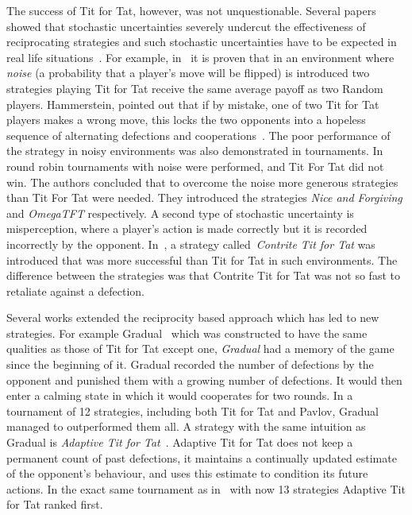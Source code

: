 The success of Tit for Tat, however, was not unquestionable. Several papers
showed that stochastic uncertainties severely undercut the effectiveness of
reciprocating strategies and such stochastic uncertainties have to be expected
in real life situations~\cite{Milinski1987}. For example, in~\cite{Molander1985}
it is
proven that in an environment where \textit{noise} (a probability that a
player's move will be flipped) is introduced two strategies playing Tit for Tat
receive the same average payoff as two Random players.
Hammerstein, pointed out that if by mistake, one of two
Tit for Tat players makes a wrong move, this locks the two opponents into a
hopeless sequence of alternating defections and cooperations~\cite{Hammerstein1984}.
The poor performance of the strategy in noisy environments was also demonstrated
in tournaments. In~\cite{Bendor1991, Donninger1986} round robin
tournaments with noise were performed, and Tit For Tat did not win.
The authors concluded that to overcome the noise more generous strategies
than Tit For Tat were needed. They introduced the strategies \textit{Nice and Forgiving}
and \textit{OmegaTFT} respectively.
A second type of stochastic uncertainty is
misperception, where a player's action is made correctly but it is recorded
incorrectly by the opponent. In~\cite{Wu1995}, a strategy
called~\textit{Contrite Tit for Tat} was introduced that was more successful than Tit for Tat
in such environments. The difference between the strategies was that Contrite
Tit for Tat was not so fast to retaliate against a defection.

Several works extended the reciprocity based approach which has led to new
strategies. For example Gradual~\cite{Beaufils1997} which was constructed to
have the same qualities as those of Tit for Tat except one,
\textit{Gradual} had a memory of the game since the beginning of it. Gradual
recorded the number of defections by the opponent and punished them with a
growing number of defections. It would then enter a calming state in which it
would cooperates for two rounds. In a tournament of 12 strategies, including
both Tit for Tat and Pavlov, Gradual managed to outperformed them all. A
strategy with the same intuition as Gradual is \textit{Adaptive Tit for
Tat}~\cite{tzafestas-2000a}. Adaptive Tit for Tat does not keep a permanent
count of past defections, it maintains a continually updated estimate of the
opponent’s behaviour, and uses this estimate to condition its future actions. In
the exact same tournament as in~\cite{Beaufils1997} with now 13 strategies Adaptive
Tit for Tat ranked first.

